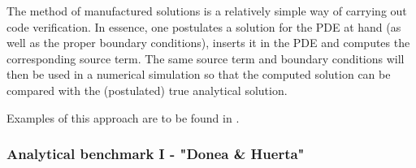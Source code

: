  

The method of manufactured solutions is a relatively simple way of carrying out
code verification. In essence, one postulates a solution for the PDE at hand (as
well as the proper boundary conditions), inserts it in the PDE and computes the 
corresponding source term. 
The same source term and boundary conditions will then be used in a numerical 
simulation so that the computed solution can be compared with the (postulated)
true analytical solution. 

Examples of this approach are to be found in \cite{dohu03,busa13,bodg06}.


\subsubsection{Analytical benchmark I \label{mms1} - "Donea \& Huerta"}

